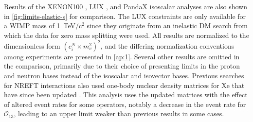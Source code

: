 \documentclass[reprint, showpacs,
preprintnumbers,
amsmath,amssymb,
aps, floatfix,
superscriptaddress,
prd, nofootinbib]{revtex4-1}
\begin{document}
\par
Results of the XENON100 \cite{Xenon100:EFT_2017}, LUX \cite{LUX:EFTR4_2021}, and PandaX \cite{PandaX2:SD_EFT_2019} isoscalar analyses are also shown in \autoref{fig:limits-elastic-s} for comparison. 
The LUX constraints are only available for a WIMP mass of 1~TeV/c$^2$ since they originate from an inelastic DM search from which the data for zero mass splitting were used.
All results are normalized to the dimensionless form $(c_i^N \times m_v^2)^2$, and the differing normalization conventions among experiments are presented in \cref{ap:1}. 
Several other results are omitted in the comparison, primarily due to their choice of presenting limits in the proton and neutron bases instead of the isoscalar and isovector bases.
Previous searches for NREFT interactions also used one-body nuclear density matrices for Xe that have since been updated \cite{Haxton_OneBody}. 
This analysis uses the updated matrices with the effect of altered event rates for some operators, notably a decrease in the event rate for $\mathcal{O}_{13}$, leading to an upper limit weaker than previous results in some cases. 
\end{document}

